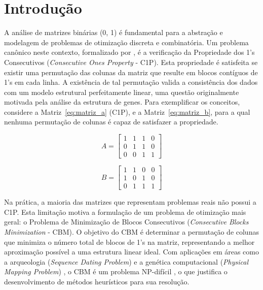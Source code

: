 \chapter{Introdução}

A análise de matrizes binárias (0, 1) é fundamental para a abstração e modelagem de problemas de otimização discreta e combinatória. Um problema canônico neste contexto, formalizado por , é a verificação da Propriedade dos 1's Consecutivos (\textit{Consecutive Ones Property} - C1P). Esta propriedade é satisfeita se existir uma permutação das colunas da matriz que resulte em blocos contíguos de 1's em cada linha. A existência de tal permutação valida a consistência dos dados com um modelo estrutural perfeitamente linear, uma questão originalmente motivada pela análise da estrutura de genes. Para exemplificar os conceitos, considere a Matriz~\eqref{eq:matriz_a} (C1P), e a Matriz~\eqref{eq:matriz_b}, para a qual nenhuma permutação de colunas é capaz de satisfazer a propriedade.

\begin{figure}[h!] %
    \centering
    \begin{minipage}{0.4\textwidth}
        \centering
        \begin{equation} \label{eq:matriz_a}
            A = \begin{bmatrix}
                1 & 1 & 1 & 0 \\
                0 & 1 & 1 & 0 \\
                0 & 0 & 1 & 1
            \end{bmatrix}
        \end{equation}
    \end{minipage}
    \begin{minipage}{0.4\textwidth}
        \centering
        \begin{equation} \label{eq:matriz_b}
            B = \begin{bmatrix}
                1 & 1 & 0 & 0 \\
                1 & 0 & 1 & 0 \\
                0 & 1 & 1 & 1
            \end{bmatrix}
        \end{equation}
    \end{minipage}
\end{figure}

Na prática, a maioria das matrizes que representam problemas reais não possui a C1P. Esta limitação motiva a formulação de um problema de otimização mais geral: o Problema de Minimização de Blocos Consecutivos (\textit{Consecutive Blocks Minimization} - CBM). O objetivo do CBM é determinar a permutação de colunas que minimiza o número total de blocos de 1's na matriz, representando a melhor aproximação possível a uma estrutura linear ideal. Com aplicações em áreas como a arqueologia (\textit{Sequence Dating Problem}) \cite{kendall1969incidence} e a genética computacional (\textit{Physical Mapping Problem}) \cite{alizadeh1995physical}, o CBM é um problema NP-difícil \cite{kou1977polynomial}, o que justifica o desenvolvimento de métodos heurísticos para sua resolução.


